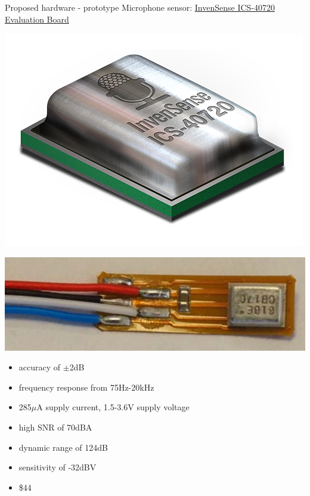 \documentclass{beamer}
\newcommand{\myhref}[2]{{\color{blue}\href{#1}{#2}}}
\begin{document}
    \begin{frame}{Proposed hardware - prototype}
        Microphone sensor: \myhref{https://www.invensense.com/products/analog/ics-40720/}{InvenSense ICS-40720 Evaluation Board}
        \begin{center}
            \begin{minipage}{0.45\linewidth}
            \includegraphics[scale=0.2]{figures/rp-ics-40720.png} 
            \end{minipage}
            \begin{minipage}{0.45\linewidth}
            \includegraphics[scale=0.2]{figures/invensense_eval.PNG}
            \end{minipage}
        \end{center}
        \begin{itemize}
            \item accuracy of $\pm$2dB
            \item frequency response from 75Hz-20kHz
            \item 285$\mu$A supply current, 1.5-3.6V supply voltage
            \item high SNR of 70dBA
            \item dynamic range of 124dB
            \item sensitivity of -32dBV
            \item \$44
        \end{itemize}
    \end{frame}
    
\end{document}
